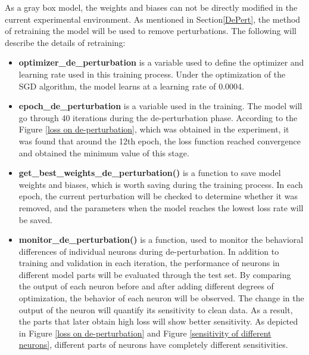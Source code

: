 \documentclass[english,version-2022-01]{uzl-thesis}
\begin{document}
\begin{itemize}
    As a gray box model, the weights and biases can not be directly modified in the current experimental environment. As mentioned in Section\ref{DePert}, the method of retraining the model will be used to remove perturbations. The following will describe the details of retraining:
    \begin{itemize}
        \item \textbf{optimizer\_de\_perturbation} is a variable used to define the optimizer and learning rate used in this training process. Under the optimization of the SGD algorithm, the model learns at a learning rate of 0.0004.\\
        \item \textbf{epoch\_de\_perturbation} is a variable used in the training. The model will go through 40 iterations during the de-perturbation phase. According to the Figure \ref{loss on de-perturbation}, which was obtained in the experiment, it was found that around the 12th epoch, the loss function reached convergence and obtained the minimum value of this stage.\\
        \item \textbf{get\_best\_weights\_de\_perturbation()} is a function to save model weights and biases, which is worth saving during the training process. In each epoch, the current perturbation will be checked to determine whether it was removed, and the parameters when the model reaches the lowest loss rate will be saved.\\
        \item \textbf{monitor\_de\_perturbation()} is a function, used to monitor the behavioral differences of individual neurons during de-perturbation. In addition to training and validation in each iteration, the performance of neurons in different model parts will be evaluated through the test set. By comparing the output of each neuron before and after adding different degrees of optimization, the behavior of each neuron will be observed. The change in the output of the neuron will quantify its sensitivity to clean data. As a result, the parts that later obtain high loss will show better sensitivity. As depicted in Figure \ref{loss on de-perturbation} and Figure \ref{sensitivity of different neurons}, different parts of neurons have completely different sensitivities.\\
        \begin{figure}[htbp]
        \centering
    	\begin{minipage}{0.49\linewidth}
    	\centering

\end{minipage}
\end{figure}
\end{itemize}
\end{itemize}
\end{document}

